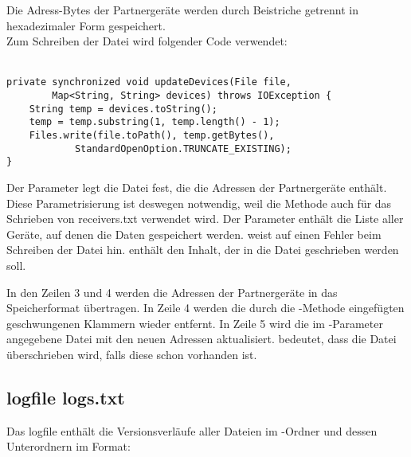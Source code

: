 Die Adress-Bytes der Partnergeräte werden durch Beistriche getrennt in hexadezimaler Form gespeichert. \\ %
Zum Schreiben der Datei wird folgender Code verwendet: \\  \\
\javalisting
\begin{minipage}{\linewidth}
\begin{lstlisting}[caption={Schreiben der Gerätedatei freceivers.txt},captionpos=b]
private synchronized void updateDevices(File file,
		Map<String, String> devices) throws IOException {
	String temp = devices.toString();
	temp = temp.substring(1, temp.length() - 1);
	Files.write(file.toPath(), temp.getBytes(),
			StandardOpenOption.TRUNCATE_EXISTING);
}
\end{lstlisting}
\end{minipage}
\begin{description}
	Der Parameter  legt die Datei fest, die die Adressen der Partnergeräte enthält. Diese Parametrisierung ist deswegen notwendig, weil die Methode  auch für das Schrieben von receivers.txt  verwendet wird.
	Der Parameter  enthält die Liste aller Geräte, auf denen die Daten gespeichert werden.
	 weist auf einen Fehler beim Schreiben der Datei hin.
	 enthält den Inhalt, der in die Datei geschrieben werden soll. 
\end{description}
In den Zeilen 3 und 4 werden die Adressen der Partnergeräte in das Speicherformat übertragen. In Zeile 4 werden die durch die -Methode  eingefügten geschwungenen Klammern wieder entfernt. In Zeile 5 wird die im -Parameter angegebene Datei mit den neuen Adressen aktualisiert.  bedeutet, dass die Datei  überschrieben wird, falls diese schon vorhanden ist.

\subsection{\gls{logfile} logs.txt}
Das \gls{logfile}   enthält die Versionsverläufe aller Dateien im \sblit-Ordner und dessen Unterordnern im Format: \\  

